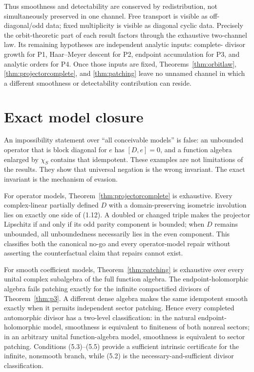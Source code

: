 \documentclass[11pt,reqno]{amsart}
\begin{document}
Thus smoothness and detectability are conserved by redistribution, not simultaneously preserved
in one channel.  Free transport is visible as off-diagonal/odd data; fixed multiplicity is visible
as diagonal cyclic data.  Precisely the orbit-theoretic part of each result factors through the
exhaustive two-channel law.  Its remaining hypotheses are independent analytic inputs: complete-
divisor growth for P1, Haar--Meyer descent for P2, endpoint accumulation for P3, and analytic
orders for P4.  Once those inputs are fixed, Theorems~\ref{thm:orbitlaw},
\ref{thm:projectorcomplete}, and \ref{thm:patching} leave no unnamed channel in which a different
smoothness or detectability contribution can reside.

\section{Exact model closure}

An impossibility statement over ``all conceivable models'' is false: an unbounded operator that
is block diagonal for $e$ has $[D,e]=0$, and a function algebra enlarged by $\chi_S$ contains that
idempotent.  These examples are not limitations of the results.  They show that universal
negation is the wrong invariant.  The exact invariant is the mechanism of evasion.

For operator models, Theorem~\ref{thm:projectorcomplete} is exhaustive.  Every complex-linear
partially defined $D$ with a domain-preserving isometric involution lies on exactly one side of
(1.12).  A doubled or changed triple makes the projector Lipschitz if and only if its odd parity
component is bounded; when $D$ remains unbounded, all unboundedness necessarily lies in the even
component.  This classifies both the canonical no-go and every operator-model repair without
asserting the counterfactual claim that repairs cannot exist.

For smooth coefficient models, Theorem~\ref{thm:patching} is exhaustive over every unital complex
subalgebra of the full function algebra.  The endpoint-holomorphic algebra fails patching exactly
for the infinite compactified divisors of Theorem~\ref{thm:p3}.  A different dense algebra makes
the same idempotent smooth exactly when it permits independent sector patching.  Hence every
completed automorphic divisor has a two-level classification: in the natural endpoint-holomorphic
model, smoothness is equivalent to finiteness of both nonreal sectors; in an arbitrary unital
function-algebra model, smoothness is equivalent to sector patching.  Conditions (5.3)--(5.5)
provide a sufficient intrinsic certificate for the infinite, nonsmooth branch, while (5.2) is the
necessary-and-sufficient divisor classification.
\end{document}
